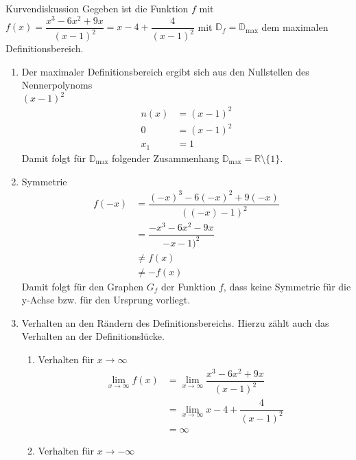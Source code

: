  \begin{bsp}{Kurvendiskussion}{}
Gegeben ist die Funktion $f$ mit $f(x) = \dfrac{x^3-6x^2+9x}{(x-1)^2} = x-4+\dfrac{4}{(x-1)^2}$ mit $\mathds{D}_f = \mathds{D}_{\text{max}}$ dem maximalen Definitionsbereich. 
 \begin{enumerate}
     \item Der maximaler Definitionsbereich ergibt sich aus den Nullstellen des Nennerpolynoms\\ $(x-1)^2$
     \begin{equation*}
    \begin{split}
        n(x) &= (x-1)^2 \\
        0&= (x-1)^2\\
        x_{1} &= 1    
    \end{split}
\end{equation*}
Damit folgt für $\mathds{D}_{\text{max}}$ folgender Zusammenhang $\mathds{D}_{\text{max}} = \mathds{R}\setminus\{1\}$.
\item Symmetrie
\begin{equation*}
    \begin{split}
        f(-x) &= \dfrac{(-x)^3-6(-x)^2+9(-x)}{((-x)-1)^2} \\
        &= \dfrac{-x^3-6x^2-9x}{-x-1)^2}\\
         &\neq  f(x)\\
         &\neq -f(x)
    \end{split}
\end{equation*}
Damit folgt für den Graphen $G_f$ der Funktion $f$, dass keine Symmetrie für die y-Achse bzw. für den Ursprung vorliegt.
 \item Verhalten an den Rändern des Definitionsbereichs. Hierzu zählt auch das Verhalten an der Definitionslücke.
 \begin{enumerate}
     \item Verhalten für $x\longrightarrow \infty$
      \begin{equation*}
    \begin{split}
        \lim_{x\longrightarrow \infty} f(x) &= \lim_{x\longrightarrow \infty} \dfrac{x^3-6x^2+9x}{(x-1)^2} \\
         &= \lim_{x\longrightarrow \infty}  x-4+\dfrac{4}{(x-1)^2}\\
         &= \infty
    \end{split}
\end{equation*}
 \item Verhalten für $x\longrightarrow -\infty$

\end{enumerate}
\end{enumerate}
\end{bsp}
